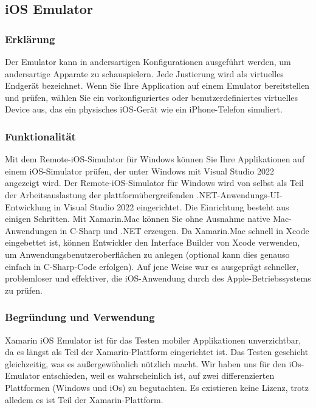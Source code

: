 \subsection{iOS Emulator}
\cite{IOsEmulatorOnMac}
\cite{IOsEmulatorOnWin}
\subsubsection*{Erklärung}
Der Emulator kann in andersartigen Konfigurationen 
ausgeführt werden, um andersartige Apparate zu schauspielern. 
Jede Justierung wird als virtuelles Endgerät bezeichnet. 
Wenn Sie Ihre Application auf einem Emulator bereitstellen 
und prüfen, wählen Sie ein vorkonfiguriertes oder 
benutzerdefiniertes virtuelles Device aus, das ein 
physisches iOS-Gerät wie ein iPhone-Telefon simuliert.
\subsubsection*{Funktionalität}
Mit dem Remote-iOS-Simulator für Windows können Sie Ihre 
Applikationen auf einem iOS-Simulator prüfen, der unter Windows mit 
Visual Studio 2022 angezeigt wird.
Der Remote-iOS-Simulator für Windows wird von selbst als Teil der 
Arbeitsauslastung der plattformübergreifenden .NET-Anwendungs-UI-Entwicklung 
in Visual Studio 2022 eingerichtet. Die Einrichtung besteht aus einigen Schritten.
Mit Xamarin.Mac können Sie ohne Ausnahme native Mac-Anwendungen in C-Sharp und .NET 
erzeugen. Da Xamarin.Mac schnell in Xcode eingebettet ist, können 
Entwickler den Interface Builder von Xcode verwenden, um Anwendungsbenutzeroberflächen 
zu anlegen (optional kann dies genauso einfach in C-Sharp-Code erfolgen). 
Auf jene Weise war es ausgeprägt schneller, problemloser und effektiver, 
die iOS-Anwendung durch des Apple-Betriebssystems zu prüfen.
\subsubsection*{Begründung und Verwendung}
Xamarin iOS Emulator ist für das Testen mobiler Applikationen unverzichtbar, 
da es längst als Teil der Xamarin-Plattform eingerichtet ist. Das Testen 
geschieht gleichzeitig, was es außergewöhnlich nützlich macht. 
Wir haben uns für den iOs-Emulator entschieden, weil es wahrscheinlich 
ist, auf zwei differenzierten Plattformen (Windows und iOs) zu 
begutachten. Es existieren keine Lizenz, trotz alledem es ist Teil der Xamarin-Plattform.
\newpage